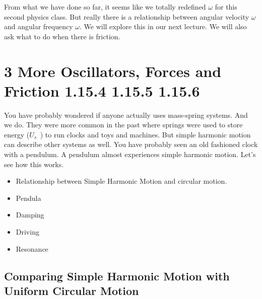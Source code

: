 \documentclass{book}
\begin{document}
From what we have done so far, it seems like we totally redefined $\omega $
for this second physics class. But really there is a relationship between
angular velocity $\omega $ and angular frequency $\omega .$ We will explore
this in our next lecture. We will also ask what to do when there is friction.

\chapter{3 More Oscillators, Forces and Friction 1.15.4 1.15.5 1.15.6}

%

You have probably wondered if anyone actually uses mass-spring systems. And
we do. They were more common in the past where springs were used to store
energy ($U_{s\text{ }}$) to run clocks and toys and machines. But simple
harmonic motion can describe other systems as well. You have probably seen
an old fashioned clock with a pendulum. A pendulum almost experiences simple
harmonic motion. Let's see how this works.

\vspace{0.10in}%

\begin{itemize}
\item Relationship between Simple Harmonic Motion and circular motion.

\item Pendula

\item Damping

\item Driving

\item Resonance
\end{itemize}

\section{Comparing Simple Harmonic Motion with Uniform Circular Motion}
\end{document}
